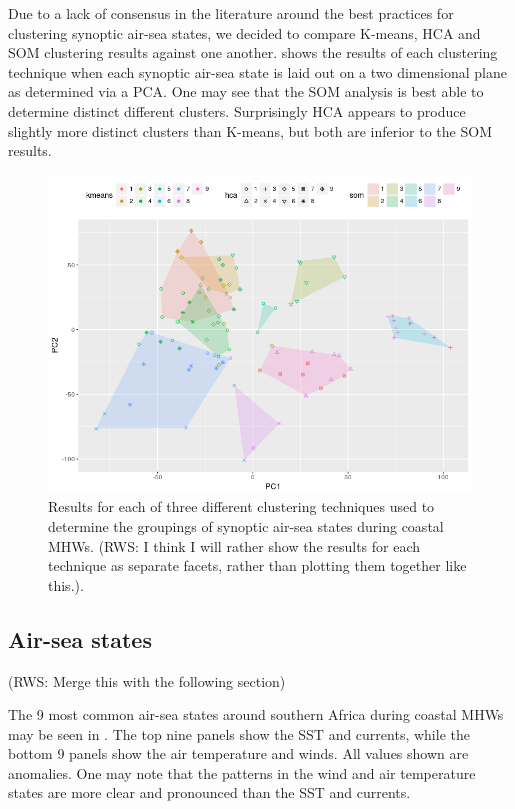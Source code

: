 \documentclass[a4paper,10pt,review]{elsarticle}
\begin{document}
Due to a lack of consensus in the literature around the best practices for clustering synoptic air-sea states, we decided to compare K-means, HCA and SOM clustering results against one another.  shows the results of each clustering technique when each synoptic air-sea state is laid out on a two dimensional plane as determined via a PCA. One may see that the SOM analysis is best able to determine distinct different clusters. Surprisingly HCA appears to produce slightly more distinct clusters than K-means, but both are inferior to the SOM results.

\begin{figure}
\includegraphics[width=1.0\textwidth]{figure_3.png}
\caption{Results for each of three different clustering techniques used to determine the groupings of synoptic air-sea states during coastal MHWs. (RWS: I think I will rather show the results for each technique as separate facets, rather than plotting them together like this.).}
\label{figure3}
\end{figure}

\subsection{Air-sea states}

(RWS: Merge this with the following section)

The 9 most common air-sea states around southern Africa during coastal MHWs may be seen in . The top nine panels show the SST and currents, while the bottom 9 panels show the air temperature and winds. All values shown are anomalies. One may note that the patterns in the wind and air temperature states are more clear and pronounced than the SST and currents.
\end{document}
